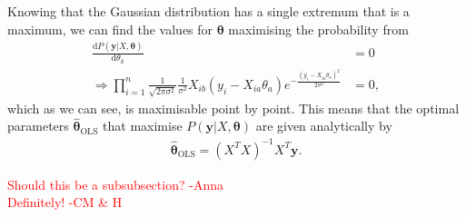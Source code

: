 \documentclass[twocolumn,english,notitlepage]{article}
\newcommand{\comment}[1]{\textcolor{red}{#1}}
\renewcommand{\d}[2][x]{\ensuremath{\frac{\mathrm{d}#2}{\mathrm{d}#1}}}
\renewcommand{\vec}[1]{\boldsymbol{#1}}
\newcommand{\pclosed}[1]{\left(#1\right)}
\renewcommand{\exp}[1]{e^{#1}}
\newcommand{\msub}[2]{\ensuremath{{#1}_\text{#2}}}
\begin{document}
        Knowing that the Gaussian distribution has a single extremum that is a maximum, we can find the values for $\vec{\theta}$ maximising the probability from
        \begin{align} \nonumber
            \d[\theta_k]{P(\vec{y}|X,\vec{\theta})} &= 0 \\
            \Rightarrow \prod_{i=1}^{n} \frac{1}{\sqrt{2\pi\sigma^2}} \frac{1}{\sigma^2} X_{ib}(y_i-X_{ia}\theta_a) \exp{-\frac{{(y_i - X_{ia}\theta_a)}^2}{2\sigma^2}} &= 0,
        \end{align}
        which as we can see, is maximisable point by point. This means that the optimal parameters $\msub{\vec{\hat{\theta}}}{OLS}$ that maximise $P(\vec{y}|X, \vec{\theta})$ are given analytically by
        \begin{align}
            \boxed{
                \msub{\vec{\hat{\theta}}}{OLS} = \pclosed{X^TX}^{-1} X^T \vec{y}.
            }
        \end{align}

    \comment{Should this be a subsubsection? -Anna}\\
    \comment{Definitely! -CM \& H}
\end{document}
